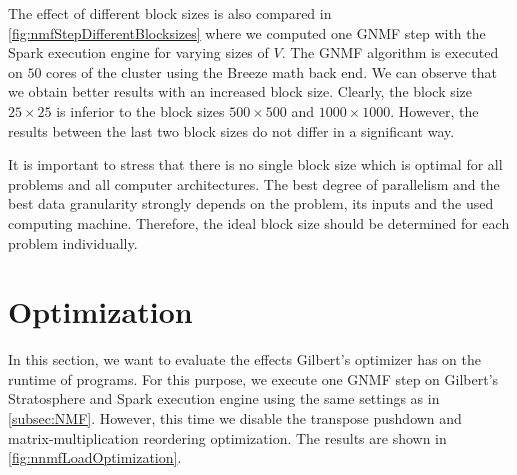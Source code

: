 The effect of different block sizes is also compared in \cref{fig:nmfStepDifferentBlocksizes} where we computed one GNMF step with the Spark execution engine for varying sizes of $V$.
The GNMF algorithm is executed on $50$ cores of the cluster using the Breeze math back end.
We can observe that we obtain better results with an increased block size.
Clearly, the block size $25 \times 25$ is inferior to the block sizes $500\times 500$ and $1000\times 1000$.
However, the results between the last two block sizes do not differ in a significant way.

It is important to stress that there is no single block size which is optimal for all problems and all computer architectures.
The best degree of parallelism and the best data granularity strongly depends on the problem, its inputs and the used computing machine.
Therefore, the ideal block size should be determined for each problem individually.

\section{Optimization}

In this section, we want to evaluate the effects Gilbert's optimizer has on the runtime of programs.
For this purpose, we execute one GNMF step on Gilbert's Stratosphere and Spark execution engine using the same settings as in \cref{subsec:NMF}.
However, this time we disable the transpose pushdown and matrix-multiplication reordering optimization.
The results are shown in \cref{fig:nnmfLoadOptimization}.

